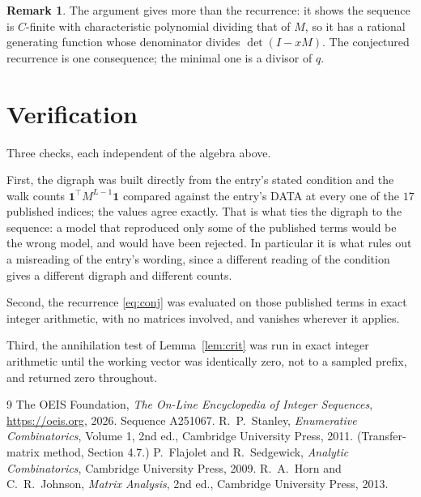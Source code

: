 \documentclass[11pt,a4paper]{article}
\theoremstyle{plain}
\theoremstyle{definition}
\newtheorem{remark}[theorem]{Remark}
\begin{document}
\begin{remark}
The argument gives more than the recurrence: it shows the sequence is $C$-finite with
characteristic polynomial dividing that of $M$, so it has a rational generating function
whose denominator divides $\det(I-xM)$. The conjectured recurrence is one consequence; the
minimal one is a divisor of $q$.
\end{remark}

\section{Verification}

Three checks, each independent of the algebra above.

First, the digraph was built directly from the entry's stated condition and the walk counts
$\mathbf{1}^{\!\top}M^{L-1}\mathbf{1}$ compared against the entry's DATA at
every one of the $17$ published indices; the values agree exactly. That is what ties
the digraph to the sequence: a model that reproduced only some of the published terms would
be the wrong model, and would have been rejected. In particular it is what rules out a
misreading of the entry's wording, since a different reading of the condition gives a
different digraph and different counts.

Second, the recurrence \eqref{eq:conj} was evaluated on those published terms in exact
integer arithmetic, with no matrices involved, and vanishes wherever it applies.

Third, the annihilation test of Lemma~\ref{lem:crit} was run in exact integer arithmetic
until the working vector was identically zero, not to a sampled prefix, and returned zero
throughout.

\begin{thebibliography}{9}
 The OEIS Foundation, \emph{The On-Line Encyclopedia of Integer
Sequences}, \url{https://oeis.org}, 2026. Sequence A251067.
 R.~P.~Stanley, \emph{Enumerative Combinatorics}, Volume 1, 2nd ed.,
Cambridge University Press, 2011. (Transfer-matrix method, Section 4.7.)
 P.~Flajolet and R.~Sedgewick, \emph{Analytic Combinatorics}, Cambridge
University Press, 2009.
 R.~A.~Horn and C.~R.~Johnson, \emph{Matrix Analysis}, 2nd ed., Cambridge
University Press, 2013.
\end{thebibliography}
\end{document}
